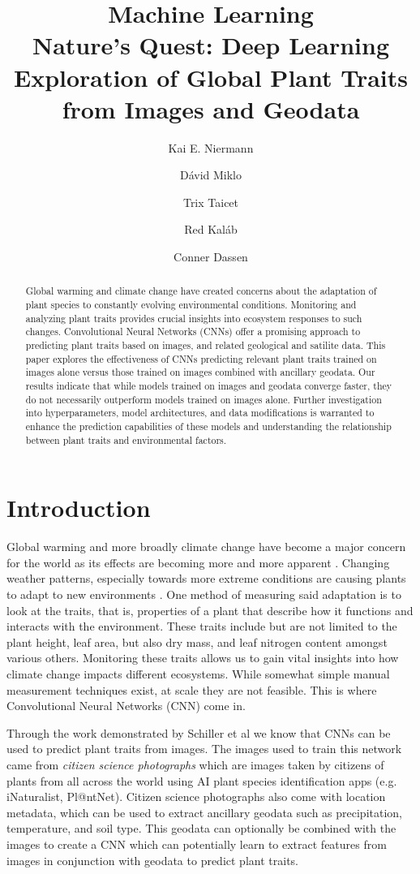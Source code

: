 \documentclass[12pt,a4paper,oneside]{article}
\title{
    \Huge{Machine Learning} \\ \LARGE 
    Nature's Quest: Deep Learning Exploration of Global Plant Traits from Images and Geodata
}
\author{
Kai E. Niermann \and
Dávid Miklo \and 
Trix Taicet \and
Red Kaláb \and
Conner Dassen
}
\date{\DTMusedate{date}}
\begin{document}
\maketitle

% 

\begin{abstract}
    Global warming and climate change have created concerns about the adaptation of plant species to constantly evolving environmental conditions. Monitoring and analyzing plant traits provides crucial insights into ecosystem responses to such changes. Convolutional Neural Networks (CNNs) offer a promising approach to predicting plant traits based on images, and related geological and satilite data. This paper explores the effectiveness of CNNs predicting relevant plant traits trained on images alone versus those trained on images combined with ancillary geodata. Our results indicate that while models trained on images and geodata converge faster, they do not necessarily outperform models trained on images alone. Further investigation into hyperparameters, model architectures, and data modifications is warranted to enhance the prediction capabilities of these models and understanding the relationship between plant traits and environmental factors.
\end{abstract}

\section{Introduction}
Global warming and more broadly climate change have become a major concern for the world as its effects are becoming more and more apparent \cite{WANG2023100237}. Changing weather patterns, especially towards more extreme conditions are causing plants to adapt to new environments \cite{GRAY201664}. One method of measuring said adaptation is to look at the traits, that is, properties of a plant that describe how it functions and interacts with the environment. These traits include but are not limited to the plant height, leaf area, but also dry mass, and leaf nitrogen content amongst various others. Monitoring these traits allows us to gain vital insights into how climate change impacts different ecosystems. While somewhat simple manual measurement techniques exist, at scale they are not feasible. This is where Convolutional Neural Networks (CNN) come in.  

\smallskip
Through the work demonstrated by Schiller et al \cite{schiller2021deep} we know that CNNs can be used to predict plant traits from images. The images used to train this network came from \textit{citizen science photographs} which are images taken by citizens of plants from all across the world using AI plant species identification apps (e.g. iNaturalist, Pl@ntNet). Citizen science photographs also come with location metadata, which can be used to extract ancillary geodata such as precipitation, temperature, and soil type. This geodata can optionally be combined with the images to create a CNN which can potentially learn to extract features from images in conjunction with geodata to predict plant traits.
\end{document}
